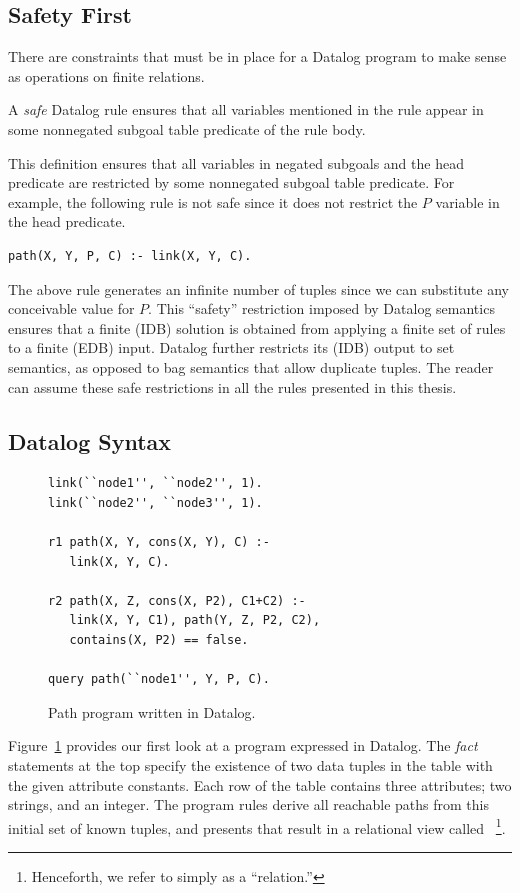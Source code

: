 \subsection{Safety First}
\label{ch:p2:sec:safety}

There are constraints that must be in place for a Datalog program to make sense
as operations on finite relations.  
\begin{mydef}
\ssp
A {\em safe} Datalog rule ensures that all variables mentioned in the rule
appear in some nonnegated subgoal table predicate of the rule body.
\end{mydef}
This definition ensures that all variables in negated subgoals and the head
predicate are restricted by some nonnegated subgoal table predicate.  For example,
the following rule is not safe since it does not restrict the $P$ variable in
the  head predicate.
\begin{lstlisting}[frame=none]
path(X, Y, P, C) :- link(X, Y, C).
\end{lstlisting}
The above rule generates an infinite number of  tuples since we can
substitute any conceivable value for $P$.  This ``safety'' restriction imposed
by Datalog semantics ensures that a finite (IDB) solution is obtained from
applying a finite set of rules to a finite (EDB) input.  Datalog further
restricts its (IDB) output to set semantics, as opposed to bag semantics that
allow duplicate tuples.  The reader can assume these safe restrictions in all
the rules presented in this thesis.

\subsection{Datalog Syntax}

\begin{figure}
\ssp
\begin{lstlisting}
link(``node1'', ``node2'', 1).
link(``node2'', ``node3'', 1).

r1 path(X, Y, cons(X, Y), C) :- 
   link(X, Y, C). 

r2 path(X, Z, cons(X, P2), C1+C2) :- 
   link(X, Y, C1), path(Y, Z, P2, C2),
   contains(X, P2) == false.

query path(``node1'', Y, P, C).
\end{lstlisting}
\caption{\label{ch:p2:fig:datalogPath}Path program written in Datalog.}
\end{figure}

Figure~\ref{ch:p2:fig:datalogPath} provides our first look at a program
expressed in Datalog.  The {\em fact} statements at the top specify the
existence of two data tuples in the  table with the given attribute
constants.  Each row of the  table contains three attributes; two
strings, and an integer.  The program rules derive all reachable paths from
this initial set of known  tuples, and presents that result in a
relational view called ~\footnote{Henceforth, we refer to simply as a
``relation.''}.


